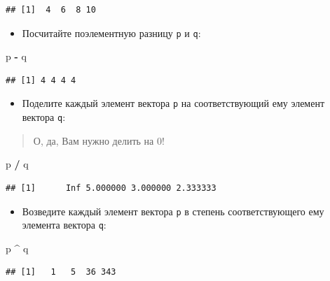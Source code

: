 \documentclass[]{book}
\newenvironment{Shaded}{\begin{snugshade}}{\end{snugshade}}
\newcommand{\StringTok}[1]{\textcolor[rgb]{0.31,0.60,0.02}{#1}}
\newcommand{\OperatorTok}[1]{\textcolor[rgb]{0.81,0.36,0.00}{\textbf{#1}}}
\newcommand{\NormalTok}[1]{#1}
\providecommand{\tightlist}{%
  \setlength{\itemsep}{0pt}\setlength{\parskip}{0pt}}
\begin{document}
\begin{verbatim}
## [1]  4  6  8 10
\end{verbatim}

\begin{itemize}
\tightlist
\item
  Посчитайте поэлементную разницу \texttt{p} и \texttt{q}:
\end{itemize}

\begin{Shaded}
\begin{Highlighting}[]
\NormalTok{p }\OperatorTok{-}\StringTok{ }\NormalTok{q}
\end{Highlighting}
\end{Shaded}

\begin{verbatim}
## [1] 4 4 4 4
\end{verbatim}

\begin{itemize}
\tightlist
\item
  Поделите каждый элемент вектора \texttt{p} на соответствующий ему
  элемент вектора \texttt{q}:
\end{itemize}

\begin{quote}
О, да, Вам нужно делить на 0!
\end{quote}

\begin{Shaded}
\begin{Highlighting}[]
\NormalTok{p }\OperatorTok{/}\StringTok{ }\NormalTok{q}
\end{Highlighting}
\end{Shaded}

\begin{verbatim}
## [1]      Inf 5.000000 3.000000 2.333333
\end{verbatim}

\begin{itemize}
\tightlist
\item
  Возведите каждый элемент вектора \texttt{p} в степень соответствующего
  ему элемента вектора \texttt{q}:
\end{itemize}

\begin{Shaded}
\begin{Highlighting}[]
\NormalTok{p }\OperatorTok{^}\StringTok{ }\NormalTok{q}
\end{Highlighting}
\end{Shaded}

\begin{verbatim}
## [1]   1   5  36 343
\end{verbatim}
\end{document}

